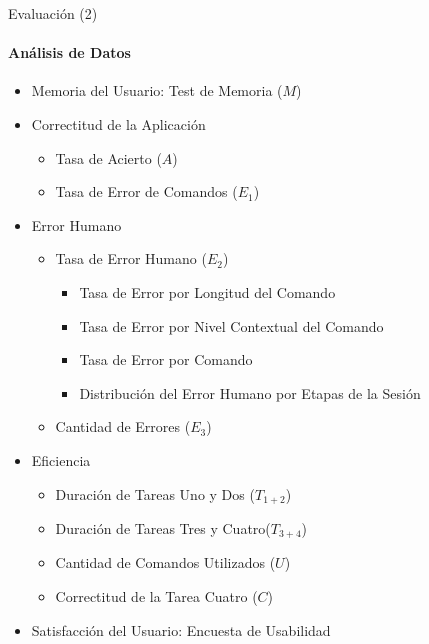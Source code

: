 \begin{frame}{Evaluaci\'on (2)}
\framesubtitle{Análisis de Datos}
    \begin{itemize}
        \item Memoria del Usuario: Test de Memoria ($M$)
        \item Correctitud de la Aplicación
            \begin{itemize}
                \item Tasa de Acierto ($A$)
                \item Tasa de Error de Comandos ($E_1$)
            \end{itemize}
        \item Error Humano
            \begin{itemize}
                \item Tasa de Error Humano ($E_2$)
                    \begin{itemize}
                        \item Tasa de Error por Longitud del Comando
                        \item Tasa de Error por Nivel Contextual del Comando
                        \item Tasa de Error por Comando
                        \item Distribuci\'on del Error Humano por Etapas de la Sesi\'on 
                    \end{itemize}
                \item Cantidad de Errores ($E_3$)
            \end{itemize}
        \item Eficiencia
            \begin{itemize}
                \item Duración de Tareas Uno y Dos ($T_{1+2}$)
                \item Duración de Tareas Tres y Cuatro($T_{3+4}$)
                \item Cantidad de Comandos Utilizados ($U$)
                \item Correctitud de la Tarea Cuatro ($C$)
            \end{itemize}
        \item Satisfacción del Usuario: Encuesta de Usabilidad
    \end{itemize}
\end{frame}